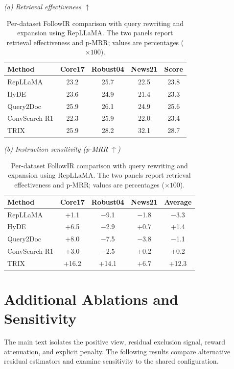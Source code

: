 \documentclass[letterpaper]{article}
\newcommand{\method}{\ifmmode \mathrm{TRIX}\else TRIX\xspace\fi}
\begin{document}
\begin{table}[t]
\centering
\small
\setlength{\tabcolsep}{3.2pt}
\textit{(a) Retrieval effectiveness $\uparrow$}\par\smallskip
\begin{tabular}{lcccc}
\toprule
\textbf{Method} & \textbf{Core17} & \textbf{Robust04} &
\textbf{News21} & \textbf{Score} \\
\midrule
RepLLaMA & 23.2 & 25.7 & 22.5 & 23.8 \\
HyDE & 23.6 & 24.9 & 21.4 & 23.3 \\
Query2Doc & 25.9 & 26.1 & 24.9 & 25.6 \\
ConvSearch-R1 & 22.3 & 25.9 & 22.0 & 23.4 \\
\method{} & 25.9 & 28.2 & 32.1 & 28.7 \\
\bottomrule
\end{tabular}

\smallskip
\textit{(b) Instruction sensitivity (p-MRR $\uparrow$)}\par\smallskip
\begin{tabular}{lcccc}
\toprule
\textbf{Method} & \textbf{Core17} & \textbf{Robust04} &
\textbf{News21} & \textbf{Average} \\
\midrule
RepLLaMA & +1.1 & $-$9.1 & $-$1.8 & $-$3.3 \\
HyDE & +6.5 & $-$2.9 & +0.7 & +1.4 \\
Query2Doc & +8.0 & $-$7.5 & $-$3.8 & $-$1.1 \\
ConvSearch-R1 & +3.0 & $-$2.5 & +0.2 & +0.2 \\
\method{} & +16.2 & +14.1 & +6.7 & +12.3 \\
\bottomrule
\end{tabular}
\caption{Per-dataset FollowIR comparison with query rewriting and
expansion using RepLLaMA.  The two panels report retrieval effectiveness and
p-MRR; values are percentages ($\times100$).}
\label{tab:rewrite-breakdown}
\end{table}

\section{Additional Ablations and Sensitivity}
\label{app:additional-ablations}

The main text isolates the positive view, residual exclusion signal, reward
attenuation, and explicit penalty.  The following results compare alternative
residual estimators and examine sensitivity to the shared configuration.
\end{document}
